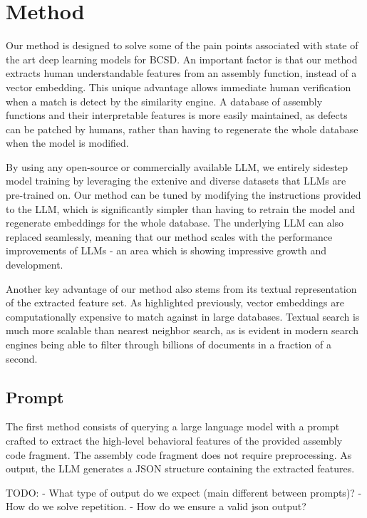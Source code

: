 \documentclass[conference,compsoc]{IEEEtran}
\begin{document}
\section{Method}

Our method is designed to solve some of the pain points associated with state of the art deep learning models for BCSD.
An important factor is that our method extracts human understandable features from an assembly function, instead
of a vector embedding. This unique advantage allows immediate human verification when a match is detect by the similarity
engine. A database of assembly functions and their interpretable features is more easily maintained, as defects can
be patched by humans, rather than having to regenerate the whole database when the model is modified.

By using any open-source or commercially available LLM, we entirely sidestep model training by leveraging the extenive
and diverse datasets that LLMs are pre-trained on.  Our method can be tuned by modifying the instructions provided to
the LLM, which is significantly simpler than having to retrain the model and regenerate embeddings for the whole database.
The underlying LLM can also replaced seamlessly, meaning that our method scales with the performance improvements
of LLMs - an area which is showing impressive growth and development.

Another key advantage of our method also stems from its textual representation of the extracted feature set. As highlighted
previously, vector embeddings are computationally expensive to match against in large databases. Textual search is much
more scalable than nearest neighbor search, as is evident in modern search engines being able to filter through billions of documents
in a fraction of a second.


\subsection{Prompt}

The first method consists of querying a large language model with a prompt crafted to extract the high-level behavioral features of
the provided assembly code fragment. The assembly code fragment does not require preprocessing. As output, the LLM generates a JSON
structure containing the extracted features.

TODO: 
- What type of output do we expect (main different between prompts)?
    - How do we solve repetition.
    - How do we ensure a valid json output?
\end{document}
